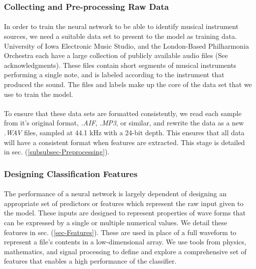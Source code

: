 \documentclass[12pt,letterpaper]{article}
\begin{document}
\subsubsection{Collecting and Pre-processing Raw Data}

\paragraph*{}In order to train the neural network to be able to identify musical instrument sources, we need a suitable data set to present to the model as training data. University of Iowa Electronic Music Studio, and the London-Based Philharmonia Orchestra each have a large collection of publicly available audio files (See acknowledgments). These files contain short segments of musical instruments performing a single note, and is labeled according to the instrument that produced the sound. The files and labels make up the core of the data set that we use to train the model.

\paragraph*{}To ensure that these data sets are formatted consistently, we read each sample from it's original format, \textit{.AIF}, \textit{.MP3}, or similar, and rewrite the data as a new \textit{.WAV} files, sampled at 44.1 kHz with a 24-bit depth. This ensures that all data will have a consistent format when features are extracted. This stage is detailed in sec. (\ref{subsubsec-Preprocessing}).


\subsubsection{Designing Classification Features}

\paragraph*{}The performance of a neural network is largely dependent of designing an appropriate set of predictors or features which represent the raw input given to the model. These inputs are designed to represent properties of wave forms that can be expressed by a single or multiple numerical values. We detail these features in sec. (\ref{sec-Features}). These are used in place of a full waveform to represent a file's contents in a low-dimensional array. We use tools from physics, mathematics, and signal processing to define and explore a comprehensive set of features that enables a high performance of the classifier. 
\end{document}
